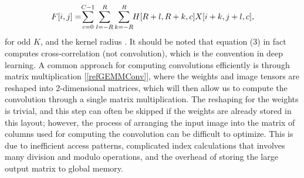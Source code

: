 \documentclass[conference,compsoc]{IEEEtran}
\newcommand{\jani}[1]{\textcolor{red}{\textbf{[Jani: #1]}}}
\newcommand{\response}[1]{\textcolor{darkgreen}{#1}}
\newcommand{\prosaic}[1]{#1}
\begin{document}
\vspace{-2.8mm}
\begin{equation}\label{xnormult}
         \hspace{-1.2mm} F[i,j]=\hspace{-1.0mm}
         \sum^{C-1}_{c=0} \sum^{R}_{l=-R} \sum^{R}_{k=-R} \hspace{-1.0mm} H[R+l,R+k,c]X[i+k,j+l,c],\hspace{-1.5mm}  
\end{equation}
for odd $K$, and the kernel radius .
It should be noted that equation (3) in fact computes cross-correlation (not convolution), which is the convention in deep learning. A common approach for computing convolutions efficiently is through matrix multiplication [\ref{refGEMMConv}], where the weights and image tensors are reshaped into 2-dimensional matrices, which will then allow us to compute the convolution through a single matrix multiplication. The reshaping for the weights is trivial, and this step can often be skipped if the weights are already stored in this layout; however, the process of arranging the input image into the matrix of columns used for computing the convolution can be difficult to optimize. This is due to inefficient access patterns, complicated index calculations that involves many division and modulo operations, and the overhead of storing the large output matrix to global memory.
\end{document}
